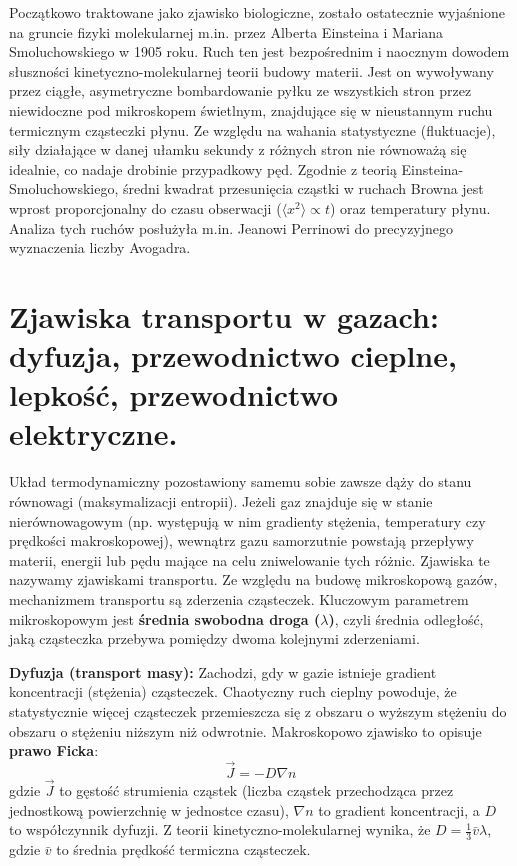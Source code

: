 \documentclass[11pt, a4paper]{article}
\begin{document}
Początkowo traktowane jako zjawisko biologiczne, zostało ostatecznie wyjaśnione na gruncie fizyki molekularnej m.in. przez Alberta Einsteina i Mariana Smoluchowskiego w 1905 roku. Ruch ten jest bezpośrednim i naocznym dowodem słuszności kinetyczno-molekularnej teorii budowy materii. Jest on wywoływany przez ciągłe, asymetryczne bombardowanie pyłku ze wszystkich stron przez niewidoczne pod mikroskopem świetlnym, znajdujące się w nieustannym ruchu termicznym cząsteczki płynu. Ze względu na wahania statystyczne (fluktuacje), siły działające w danej ułamku sekundy z różnych stron nie równoważą się idealnie, co nadaje drobinie przypadkowy pęd. Zgodnie z teorią Einsteina-Smoluchowskiego, średni kwadrat przesunięcia cząstki w ruchach Browna jest wprost proporcjonalny do czasu obserwacji ($\langle x^2 \rangle \propto t$) oraz temperatury płynu. Analiza tych ruchów posłużyła m.in. Jeanowi Perrinowi do precyzyjnego wyznaczenia liczby Avogadra.

\section{Zjawiska transportu w gazach: dyfuzja, przewodnictwo cieplne, lepkość, przewodnictwo elektryczne.}

Układ termodynamiczny pozostawiony samemu sobie zawsze dąży do stanu równowagi (maksymalizacji entropii). Jeżeli gaz znajduje się w stanie nierównowagowym (np. występują w nim gradienty stężenia, temperatury czy prędkości makroskopowej), wewnątrz gazu samorzutnie powstają przepływy materii, energii lub pędu mające na celu zniwelowanie tych różnic. Zjawiska te nazywamy zjawiskami transportu. Ze względu na budowę mikroskopową gazów, mechanizmem transportu są zderzenia cząsteczek. Kluczowym parametrem mikroskopowym jest \textbf{średnia swobodna droga ($\lambda$)}, czyli średnia odległość, jaką cząsteczka przebywa pomiędzy dwoma kolejnymi zderzeniami.

\textbf{Dyfuzja (transport masy):}
Zachodzi, gdy w gazie istnieje gradient koncentracji (stężenia) cząsteczek. Chaotyczny ruch cieplny powoduje, że statystycznie więcej cząsteczek przemieszcza się z obszaru o wyższym stężeniu do obszaru o stężeniu niższym niż odwrotnie. Makroskopowo zjawisko to opisuje \textbf{prawo Ficka}:
\[
\vec{J} = -D \nabla n
\]
gdzie $\vec{J}$ to gęstość strumienia cząstek (liczba cząstek przechodząca przez jednostkową powierzchnię w jednostce czasu), $\nabla n$ to gradient koncentracji, a $D$ to współczynnik dyfuzji. Z teorii kinetyczno-molekularnej wynika, że $D = \frac{1}{3} \bar{v} \lambda$, gdzie $\bar{v}$ to średnia prędkość termiczna cząsteczek.
\end{document}
